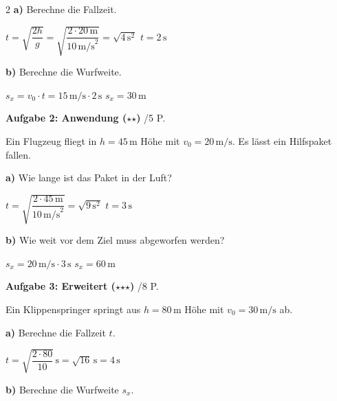 \documentclass[10pt, a4paper]{article}
\newcommand{\fachfarbe}{physik}
\newcommand{\stmark}{$\star$}
\newcommand{\abschnitt}[1]{%
    \vspace{8pt}
    \noindent\textbf{\textcolor{\fachfarbe}{#1}}
    \vspace{4pt}
}
\newcommand{\punkte}[1]{\hfill\small\textcolor{grau}{/#1 P.}}
\begin{document}
\begin{multicols}{2}
\textbf{a)} Berechne die Fallzeit.

\textcolor{loesung}{$t = \sqrt{\dfrac{2h}{g}} = \sqrt{\dfrac{2 \cdot 20\,\text{m}}{10\,\text{m/s}^2}} = \sqrt{4\,\text{s}^2}$ \quad $\boxed{t = 2\,\text{s}}$}

\vspace{4pt}

\textbf{b)} Berechne die Wurfweite.

\textcolor{loesung}{$s_x = v_0 \cdot t = 15\,\text{m/s} \cdot 2\,\text{s}$ \quad $\boxed{s_x = 30\,\text{m}}$}

\vspace{4pt}


\abschnitt{Aufgabe 2: Anwendung (\stmark\stmark)}\punkte{5}

Ein Flugzeug fliegt in $h = 45\,\text{m}$ Höhe mit $v_0 = 20\,\text{m/s}$. Es lässt ein Hilfspaket fallen.

\textbf{a)} Wie lange ist das Paket in der Luft?

\textcolor{loesung}{$t = \sqrt{\dfrac{2 \cdot 45\,\text{m}}{10\,\text{m/s}^2}} = \sqrt{9\,\text{s}^2}$ \quad $\boxed{t = 3\,\text{s}}$}

\vspace{4pt}

\textbf{b)} Wie weit vor dem Ziel muss abgeworfen werden?

\textcolor{loesung}{$s_x = 20\,\text{m/s} \cdot 3\,\text{s}$ \quad $\boxed{s_x = 60\,\text{m}}$}

\vspace{4pt}


\abschnitt{Aufgabe 3: Erweitert (\stmark\stmark\stmark)}\punkte{8}

Ein Klippenspringer springt aus $h = 80\,\text{m}$ Höhe mit $v_0 = 30\,\text{m/s}$ ab.

\textbf{a)} Berechne die Fallzeit $t$.

\textcolor{loesung}{$t = \sqrt{\dfrac{2 \cdot 80}{10}}\,\text{s} = \sqrt{16}\,\text{s} = \boxed{4\,\text{s}}$}

\vspace{2pt}

\textbf{b)} Berechne die Wurfweite $s_x$.


\end{multicols}
\end{document}
